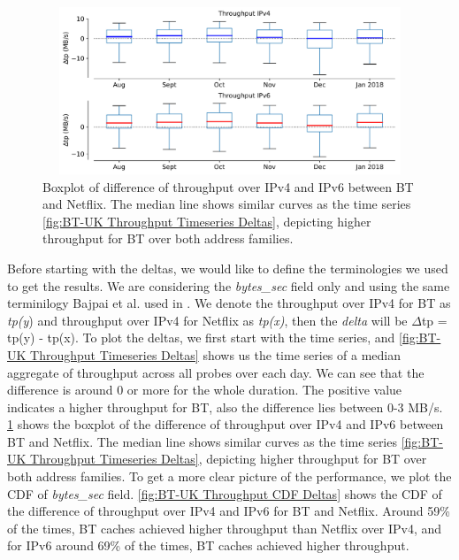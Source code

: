 \begin{figure}[!ht]
	\centering
	\includegraphics[keepaspectratio, height=5cm, width=15cm]{figures/cache/btuk/netflix-throughput-boxplot-asn-2856.pdf}
	\caption[BT-UK Throughput Boxplot Deltas]{Boxplot of difference of throughput over IPv4 and IPv6 between BT and Netflix. The median line shows similar curves as the time series \cref{fig:BT-UK Throughput Timeseries Deltas}, depicting higher throughput for BT over both address families.}
	\label{fig:BT-UK Throughput Boxplot Deltas}
\end{figure}

Before starting with the deltas, we would like to define the terminologies we used to get the results. We are considering the \textit{bytes\_sec} field only and using the same terminilogy Bajpai et al. used in \cite{bajpaimeasuring}. We denote the throughput 
over IPv4 for BT as \textit{tp(y}) and throughput over IPv4 for Netflix as \textit{tp(x)}, then the \textit{delta} will be $\Delta$tp = tp(y) - tp(x).
To plot the deltas, we first start with the time series, and \cref{fig:BT-UK Throughput Timeseries Deltas} shows us the time series of a median aggregate of throughput across all probes over each day.
We can see that the difference is around 0 or more for the whole duration. The positive value indicates a higher throughput for BT, also the difference lies between 0-3 MB/s.
\cref{fig:BT-UK Throughput Boxplot Deltas} shows the boxplot of the difference of throughput over IPv4 and IPv6 between BT and Netflix. The median line shows similar curves as the time series \cref{fig:BT-UK Throughput Timeseries Deltas}, depicting higher throughput for BT over both address families.
To get a more clear picture of the performance, we plot the CDF of \textit{bytes\_sec} field. 
\cref{fig:BT-UK Throughput CDF Deltas} shows the CDF of the difference of throughput over IPv4 and IPv6 for BT and Netflix. 
Around 59\% of the times, BT caches achieved higher throughput than Netflix over IPv4, and for IPv6 around 69\% of the times, BT caches achieved higher throughput.


